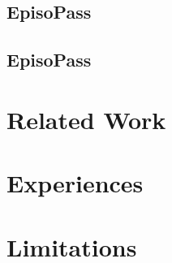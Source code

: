 \documentclass{article}
\begin{document}
\subsection{EpisoPass}

%

\subsection{EpisoPass}


% 
% 
% 
%

\section{Related Work}

% 
% 
% 
% 
% 
% 
%

\section{Experiences}

\section{Limitations}

% 
% 

{\scriptsize


}
\end{document}
